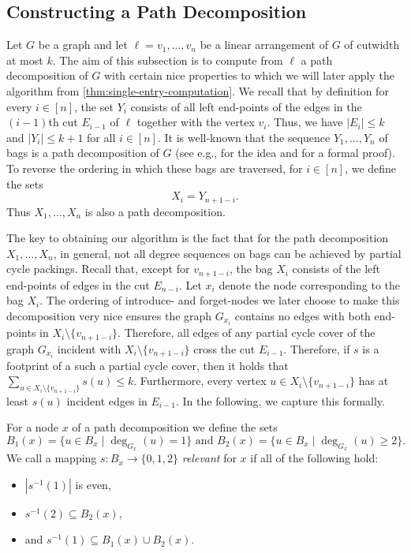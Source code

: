 \documentclass[a4paper,UKenglish,cleveref, autoref, thm-restate]{lipics-v2021}
\begin{document}
\subsection{Constructing a Path Decomposition}
Let $G$ be a graph and let $\ell = v_1, \dots, v_n$ be a linear arrangement of $G$ of cutwidth at most $k$.
The aim 
of this subsection 
is to compute from $\ell$ a path decomposition of $G$ with certain nice properties to which we will later apply the algorithm from \cref{thm:single-entry-computation}.
We recall that by definition for every $i \in [n]$, the set $Y_i$ consists of all left end-points of the edges in the $(i-1)$th cut $E_{i-1}$ of $\ell$ together with the vertex $v_i$.
Thus, we have $|E_i| \leq k$ and $|Y_i| \leq k + 1$ for all $i \in [n]$.
It is well-known that the sequence $Y_1, \dots, Y_n$ of bags is a path decomposition of $G$ (see e.g., \cite{DBLP:conf/stacs/GroenlandMNS22} for the idea and \cite{DBLP:conf/stacs/BojikianCHK23} for a formal proof).
To reverse the ordering in which these bags are traversed, for $i \in [n]$, we define the sets
\begin{equation}\label{eq:X-path-dec}
 	X_i = Y_{n+1-i}.
\end{equation}
 Thus $X_1, \dots, X_n$ is also a path decomposition. 

The key to obtaining our algorithm is the fact that for the path decomposition $X_1, \dots, X_n$, in general, not all degree sequences on bags can be achieved by partial cycle packings.
Recall that, except for $v_{n+1-i}$, the bag $X_i$ consists of the left end-points of edges in the cut $E_{n-i}$.
Let $x_i$ denote the node corresponding to the bag $X_i$.
The ordering of introduce- and forget-nodes we later choose to make this decomposition very nice ensures the graph $G_{x_i}$ contains no edges with both end-points in $X_i \setminus \{v_{n+1-i}\}$.
Therefore, 
all edges of any partial cycle cover of the graph $G_{x_i}$ incident with $X_i \setminus \{v_{n+1-i}\}$ cross the cut $E_{i-1}$.
Therefore, if $s$ is a footprint of a such a partial cycle cover, then it holds that $\sum_{u \in X_i \setminus \{v_{n+1-i}\}} s(u) \leq k$.
Furthermore, every vertex $u \in X_i \setminus \{v_{n+1-i}\}$ has at least $s(u)$ incident edges in $E_{i-1}$.
In the following, we capture this formally. 


\begin{definition}
	For a node $x$ of a path decomposition we define the sets 
	\[
		B_1(x) = \{u \in B_x \mid \deg_{G_x}(u) = 1\} \text{ and } B_2(x) = \{u \in B_x \mid \deg_{G_x}(u) \geq 2\}.
	\]
	We call a mapping $s \colon B_x \to \{0, 1, 2\}$ \emph{relevant}  for $x$  if all of the following hold:
	\begin{itemize}
		\item $|s^{-1}(1)|$ is even,
		\item $s^{-1}(2) \subseteq B_2(x)$,
		\item and $s^{-1}(1) \subseteq B_1(x) \cup B_2(x)$.
	\end{itemize}
\end{definition}
\end{document}
